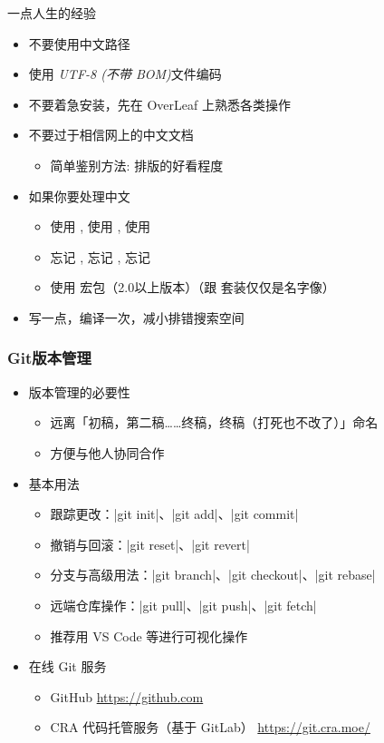 \begin{frame}{一点人生的经验}
  \begin{itemize}
    \item 不要使用中文路径
    \item 使用 \emph{UTF-8 (不带 BOM)}文件编码
    \item 不要着急安装，先在 OverLeaf 上熟悉各类操作
    \item 不要过于相信网上的中文文档
      \begin{itemize}
        \item 简单鉴别方法: 排版的好看程度
      \end{itemize}
    \item 如果你要处理中文
      \begin{itemize}
        \item 使用 \XeLaTeX, 使用 \XeLaTeX, 使用 \XeLaTeX
        \item 忘记 , 忘记 , 忘记 
        \item 使用  宏包（2.0以上版本）（跟 \CTeX 套装仅仅是名字像）
      \end{itemize}
    \item 写一点，编译一次，减小排错搜索空间
  \end{itemize}
\end{frame}

\begin{frame}[fragile]
  \frametitle{Git版本管理}
  \begin{itemize}
    \item 版本管理的必要性
      \begin{itemize}
        \item 远离「初稿，第二稿……终稿，终稿（打死也不改了）」命名
        \item 方便与他人协同合作
      \end{itemize}
    \item 基本用法
      \begin{itemize}
        \item 跟踪更改：|git init|、|git add|、|git commit|
        \item 撤销与回滚：|git reset|、|git revert|
        \item 分支与高级用法：|git branch|、|git checkout|、|git rebase|
        \item 远端仓库操作：|git pull|、|git push|、|git fetch|
        \item 推荐用 VS Code 等进行可视化操作
      \end{itemize}
    \item 在线 Git 服务
      \begin{itemize}
        \item GitHub \url{https://github.com}
        \item CRA 代码托管服务（基于 GitLab） \url{https://git.cra.moe/}
      \end{itemize}
  \end{itemize}
  \end{frame}

